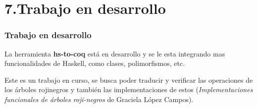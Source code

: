\documentclass[xcolor=dvipsnames,table,handout]{beamer}
\begin{document}
\section{7.Trabajo en desarrollo}
\begin{frame}
  \frametitle{Trabajo en desarrollo}
  La herramienta \textbf{hs-to-coq} est\'a en desarrollo y se le esta 
integrando mas funcionalidades de Haskell, como clases, polimorfismos, etc.

\vspace*{10pt}

  Este es un trabajo en curso, se busca poder traducir y verificar 
  las operaciones de los \'arboles rojinegros y tambi\'en las implementaciones 
  de estos (\textit{Implementaciones funcionales de árboles roji-negros} de 
  Graciela López Campos).
  
\end{frame}
\end{document}
